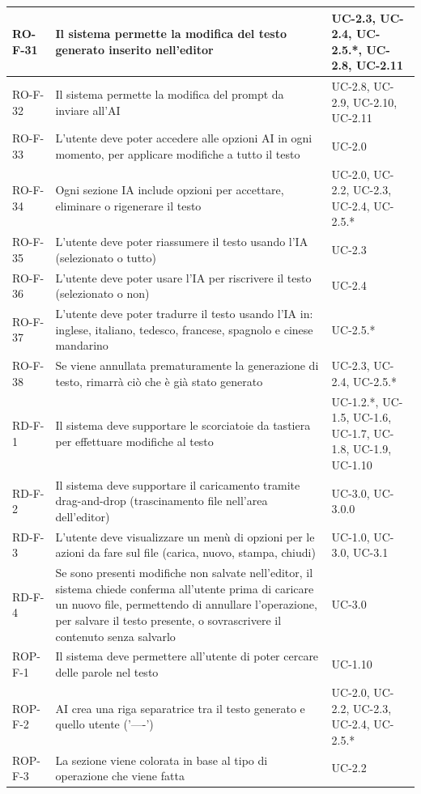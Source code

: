 \documentclass[11pt,a4paper]{article}
\begin{document}
\begin{longtable}{|p{}|>{\raggedright\arraybackslash}p{}|p{}|}
\hline
RO-F-31 & Il sistema permette la modifica del testo generato inserito nell'editor & UC-2.3, UC-2.4, UC-2.5.*, UC-2.8, UC-2.11 \\
\hline
RO-F-32 & Il sistema permette la modifica del prompt da inviare all'AI & UC-2.8, UC-2.9, UC-2.10, UC-2.11 \\
\hline
RO-F-33 & L'utente deve poter accedere alle opzioni AI in ogni momento, per applicare modifiche a tutto il testo & UC-2.0 \\
\hline
RO-F-34 & Ogni sezione IA include opzioni per accettare, eliminare o rigenerare il testo & UC-2.0, UC-2.2, UC-2.3, UC-2.4, UC-2.5.* \\
\hline
RO-F-35 & L'utente deve poter riassumere il testo usando l'IA (selezionato o tutto) & UC-2.3 \\
\hline
RO-F-36 & L'utente deve poter usare l'IA per riscrivere il testo (selezionato o non) & UC-2.4 \\
\hline
RO-F-37 & L'utente deve poter tradurre il testo usando l'IA in: inglese, italiano, tedesco, francese, spagnolo e cinese mandarino & UC-2.5.* \\
\hline
RO-F-38 & Se viene annullata prematuramente la generazione di testo, rimarrà ciò che è già stato generato & UC-2.3, UC-2.4, UC-2.5.* \\
\hline
RD-F-1 & Il sistema deve supportare le scorciatoie da tastiera per effettuare modifiche al testo & UC-1.2.*, UC-1.5, UC-1.6, UC-1.7, UC-1.8, UC-1.9, UC-1.10 \\
\hline
RD-F-2 & Il sistema deve supportare il caricamento tramite drag-and-drop (trascinamento file nell'area dell'editor) & UC-3.0, UC-3.0.0 \\
\hline
RD-F-3 & L'utente deve visualizzare un menù di opzioni per le azioni da fare sul file (carica, nuovo, stampa, chiudi) & UC-1.0, UC-3.0, UC-3.1 \\
\hline
RD-F-4 & Se sono presenti modifiche non salvate nell'editor, il sistema chiede conferma all'utente prima di caricare un nuovo file, permettendo di annullare l'operazione, per salvare il testo presente, o sovrascrivere il contenuto senza salvarlo & UC-3.0 \\
\hline
ROP-F-1 & Il sistema deve permettere all'utente di poter cercare delle parole nel testo & UC-1.10 \\
\hline
ROP-F-2 & AI crea una riga separatrice tra il testo generato e quello utente ('----') & UC-2.0, UC-2.2, UC-2.3, UC-2.4, UC-2.5.* \\
\hline
ROP-F-3 & La sezione viene colorata in base al tipo di operazione che viene fatta & UC-2.2 \\

\end{longtable}
\end{document}
